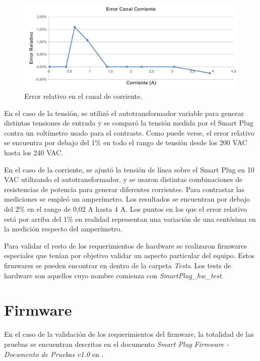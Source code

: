 \begin{figure}[h]
	\centering
	\includegraphics[width=14cm]{./Figures/4_1_1_error_canal_corriente.png}
	\caption{Error relativo en el canal de corriente.}
	\label{fig:error_canal_corriente}
\end{figure}

En el caso de la tensión, se utilizó el autotransformador variable para generar distintas tensiones de entrada y se comparó la tensión medida por el Smart Plug contra un voltímetro usado para el contraste. Como puede verse, el error relativo se encuentra por debajo del 1\% en todo el rango de tensión desde los 200 VAC hasta los 240 VAC.

En el caso de la corriente, se ajustó la tensión de línea sobre el Smart Plug en 10 VAC utilizando el autotransformador, y se usaron distintas combinaciones de resistencias de potencia para generar diferentes corrientes. Para contrastar las mediciones se empleó un amperímetro. Los resultados se encuentran por debajo del 2\% en el rango de 0,02 A hasta 4 A. Los puntos en los que el error relativo está por arriba del 1\% en realidad representan una variación de una centésima en la medición respecto del amperímetro.

Para validar el resto de los requerimientos de hardware se realizaron firmwares especiales que tenían por objetivo validar un aspecto particular del equipo. Estos firmwares se pueden encontrar en \citep{repo_firmware} dentro de la carpeta \textit{Tests}. Los tests de hardware son aquellos cuyo nombre comienza con \textit{SmartPlug\_hw\_test}.


\section{Firmware}
\label{sec:validacion_firmware}

En el caso de la validación de los requerimientos del firmware, la totalidad de las pruebas se encuentran descritas en el documento \textit{Smart Plug Firmware - Documento de Pruebas v1.0} en \citep{repo_docu_firmware}.

